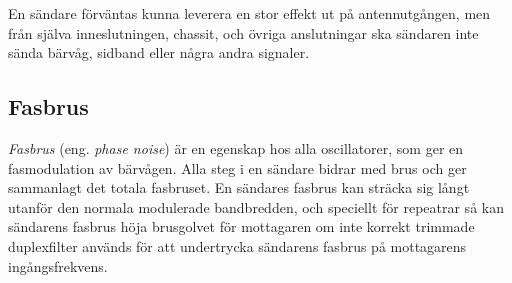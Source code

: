 En sändare förväntas kunna leverera en stor effekt ut på antennutgången, men
från själva inneslutningen, chassit, och övriga anslutningar ska sändaren
inte sända bärvåg, sidband eller några andra signaler.

\subsection{Fasbrus}

\emph{Fasbrus} (eng. \emph{phase noise}) är en egenskap hos alla oscillatorer,
som ger en fasmodulation av bärvågen.
Alla steg i en sändare bidrar med brus och ger sammanlagt det totala fasbruset.
En sändares fasbrus kan sträcka sig långt utanför den normala modulerade
bandbredden, och speciellt för repeatrar så kan sändarens fasbrus höja
brusgolvet för mottagaren om inte korrekt trimmade duplexfilter
används för att undertrycka sändarens fasbrus på mottagarens ingångsfrekvens.

